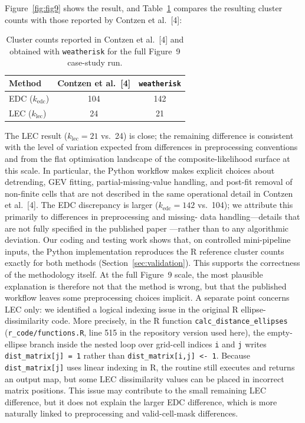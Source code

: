 \documentclass[preprint,12pt,a4paper]{elsarticle}
\newcommand{\rev}[1]{{#1}}
\newcommand{\revb}[1]{{\color{RevisionBlue}#1}}
\begin{document}
\rev{Figure~\ref{fig:fig9} shows the result, and
Table~\ref{tab:fig9-counts} compares the resulting cluster counts with
those reported by Contzen et al.~[4]:}

\begin{table}[ht]
\centering
\begin{tabular}{lcc}
\toprule
\textbf{Method} & \textbf{Contzen et al.~[4]} &
  \textbf{\texttt{weatherisk}} \\
\midrule
EDC ($k_{\text{edc}}$) & 104 & 142 \\
LEC ($k_{\text{lec}}$) & 24 & 21 \\
\bottomrule
\end{tabular}
\caption{Cluster counts reported in Contzen et al.~[4] and obtained
  with \texttt{weatherisk} for the full Figure~9 \revb{case-study run}.}
\label{tab:fig9-counts}
\end{table}

\rev{The LEC result ($k_{\text{lec}} = 21$ vs.\ 24) is close; the
remaining difference is consistent with the level of variation
expected from differences in preprocessing conventions and from the
flat optimisation landscape of the composite-likelihood surface at
this scale. In particular, the Python workflow makes explicit choices
about detrending, GEV fitting, partial-missing-value handling, and
post-fit removal of non-finite cells that are not described in the
same operational detail in Contzen et al.~[4]. The EDC
discrepancy is larger ($k_{\text{edc}} = 142$ vs.\ 104); we
attribute this primarily to differences in preprocessing and missing-
data handling---details that are not fully specified in the published paper
---rather than to any algorithmic deviation. Our coding and testing
work shows that, on controlled mini-pipeline inputs, the Python
implementation reproduces the R reference cluster counts exactly for
both methods (Section~\ref{sec:validation}). This supports the
correctness of the methodology itself. At the full Figure~9 scale,
the most plausible explanation is therefore not that the method is
wrong, but that the published workflow leaves some preprocessing
choices implicit. A separate point concerns LEC only: we identified a
logical indexing issue in the original R ellipse-dissimilarity code.
More precisely, in the R function \texttt{calc\_distance\_ellipses}
(\texttt{r\_code/functions.R}, line 515 in the repository version used
here), the empty-ellipse branch inside the nested loop over grid-cell
indices \texttt{i} and \texttt{j} writes \texttt{dist\_matrix[j] = 1}
rather than \texttt{dist\_matrix[i,j] <- 1}. Because \texttt{dist\_matrix[j]}
uses linear indexing in R, the routine still executes and returns an
output map, but some LEC dissimilarity values can be placed in
incorrect matrix positions. This issue may contribute to the small
remaining LEC difference, but it does not explain the larger EDC
difference, which is more naturally linked to preprocessing and
valid-cell-mask differences.}
\end{document}

